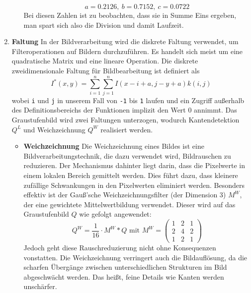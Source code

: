 \documentclass[course=erap]{aspdoc}
\begin{document}
\begin{enumerate}
\begin{itemize}
    $$ a = 0.2126 , \: b = 0.7152 , \: c = 0.0722 $$ 
    Bei diesen Zahlen ist zu beobachten, dass sie in Summe Eins ergeben, man spart sich also die Division und damit Laufzeit.
    \end{itemize}
\item \textbf{Faltung} \newline
    In der Bildverarbeitung wird die diskrete Faltung verwendet, um Filteroperationen auf Bildern durchzuführen. Es handelt sich meist um eine quadratische Matrix und eine lineare Operation. Die diskrete zweidimensionale Faltung für Bildbearbeitung ist definiert als 
    \[
    I^*(x,y) = \sum_{i=1}^{n}\sum_{j=1}^{n} I(x-i+a,j-y+a)k(i,j)
    \]
    wobei \texttt{i} und \texttt{j} in unserem Fall von \texttt{-1} bis \texttt{1} laufen und ein Zugriff außerhalb des Definitionsbereichs der Funktionen implizit den Wert 0 annimmt. \newline
    Das Graustufenbild wird zwei Faltungen unterzogen, wodurch Kantendetektion $Q^L$ und Weichzeichnung $Q^W$ realisiert werden.
\begin{itemize}
   \item \textbf{Weichzeichnung} \newline
    Die Weichzeichnung eines Bildes ist eine Bildverarbeitungstechnik, die dazu verwendet wird, Bildrauschen zu reduzieren. Der Mechanismus dahinter liegt darin, dass die Pixelwerte in einem lokalen Bereich gemittelt werden. Dies führt dazu, dass kleinere zufällige Schwankungen in den Pixelwerten eliminiert werden. Besonders effektiv ist der Gauß'sche Weichzeichnungsfilter (der Dimension 3) \texttt{$M^W$}, der eine gewichtete Mittelwertbildung verwendet. Dieser wird auf das Graustufenbild $Q$ wie gefolgt angewendet:
    \[
        Q^W = \frac{1}{16}\cdot M^W\ast Q \text{ mit } M^W = \begin{pmatrix}
            1 & 2 & 1 \\ 2 & 4 & 2 \\ 1 & 2 & 1
        \end{pmatrix}
    \]
    Jedoch geht diese Rauschreduzierung nicht ohne Konsequenzen vonstatten. Die Weichzeichnung verringert auch die Bildauflösung, da die scharfen Übergänge zwischen unterschiedlichen Strukturen im Bild abgeschwächt werden. Das heißt, feine Details wie Kanten werden unschärfer.


\end{itemize}
\end{enumerate}
\end{document}
